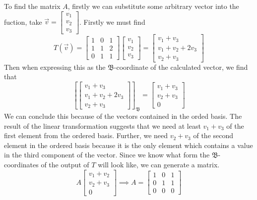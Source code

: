 \documentclass{report}
\begin{document}
\sol To find the matrix $A$, firstly we can substitute some arbitrary vector into the fuction, take $\vec{v} = \begin{bmatrix}v_1 \\ v_2 \\ v_3\end{bmatrix}$. Firstly we must find
$$
T(\vec{v}) = 
\begin{bmatrix}
1 & 0 & 1 \\ 
1 & 1 & 2 \\ 
0 & 1 & 1 
\end{bmatrix}
\begin{bmatrix}
v_1 \\ v_2 \\ v_3
\end{bmatrix} =
\begin{bmatrix}
v_1 + v_3 \\ v_1 + v_2 + 2v_3 \\ v_2 + v_3
\end{bmatrix}
$$
Then when expressing this as the $\mathfrak{B}$-coordinate of the calculated vector, we find that
$$
\left[\begin{bmatrix}
v_1 + v_3 \\ v_1 + v_2 + 2v_3 \\ v_2 + v_3
\end{bmatrix}\right]_{\mathfrak{B}} = \begin{bmatrix} v_1 + v_3 \\ v_2 + v_3 \\ 0 \end{bmatrix}
$$
We can conclude this because of the vectors contained in the orded basis. The result of the linear transformation suggests that we need at least $v_1 + v_3$ of the first element from the ordered basis. Further, we need $v_2 + v_3$ of the second element in the ordered basis because it is the only element which contains a value in the third component of the vector. Since we know what form the $\mathfrak{B}$-coordinates of the output of $T$ will look like, we can generate a matrix.
$$
A\begin{bmatrix}v_1 + v_2 \\ v_2 + v_3 \\ 0\end{bmatrix} \implies A = \begin{bmatrix} 1 & 0 & 1 \\ 0 & 1 & 1 \\ 0 & 0 & 0 \end{bmatrix}
$$
\end{document}
